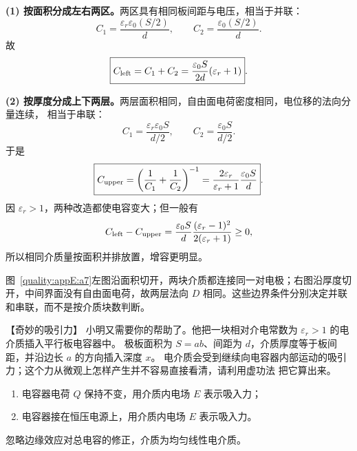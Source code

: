 \begin{xesolution}
\textbf{(1) 按面积分成左右两区。}两区具有相同板间距与电压，相当于并联：
\[
  C_1=\frac{\varepsilon_r\varepsilon_0(S/2)}d,
  \qquad C_2=\frac{\varepsilon_0(S/2)}d.
\]
故
\begin{equation}
  \boxed{C_{\rm left}=C_1+C_2
  =\frac{\varepsilon_0S}{2d}(\varepsilon_r+1)}.
\end{equation}

\textbf{(2) 按厚度分成上下两层。}两层面积相同，自由面电荷密度相同，电位移的法向分量连续，
相当于串联：
\[
  C_1=\frac{\varepsilon_r\varepsilon_0S}{d/2},
  \qquad C_2=\frac{\varepsilon_0S}{d/2}.
\]
于是
\begin{equation}
  \boxed{C_{\rm upper}=\left(\frac1{C_1}+\frac1{C_2}\right)^{-1}
  =\frac{2\varepsilon_r}{\varepsilon_r+1}\frac{\varepsilon_0S}{d}}.
\end{equation}
因 $\varepsilon_r>1$，两种改造都使电容变大；但一般有
\[
  C_{\rm left}-C_{\rm upper}
  =\frac{\varepsilon_0S}{d}\frac{(\varepsilon_r-1)^2}{2(\varepsilon_r+1)}\ge0,
\]
所以相同介质量按面积并排放置，增容更明显。


图~\ref{quality:appE:a7}左图沿面积切开，两块介质都连接同一对电极；右图沿厚度切开，中间界面没有自由面电荷，故两层法向 $D$ 相同。这些边界条件分别决定并联和串联，而不是按介质块数判断。
\end{xesolution}

\begin{origexamplebox}{【奇妙的吸引力】}\label{appE:ex:s21-32-5}
小明又需要你的帮助了。他把一块相对介电常数为 $\varepsilon_r>1$ 的电介质插入平行板电容器中。
极板面积为 $S=ab$、间距为 $d$，介质厚度等于板间距，并沿边长 $a$ 的方向插入深度 $x$。
电介质会受到继续向电容器内部运动的吸引力；这个力从微观上怎样产生并不容易直接看清，请利用虚功法
把它算出来。
\begin{enumerate}[label=(\arabic*),leftmargin=2.2em]
  \item 电容器电荷 $Q$ 保持不变，用介质内电场 $E$ 表示吸入力；
  \item 电容器接在恒压电源上，用介质内电场 $E$ 表示吸入力。
\end{enumerate}

忽略边缘效应对总电容的修正，介质为均匀线性电介质。

\end{origexamplebox}

